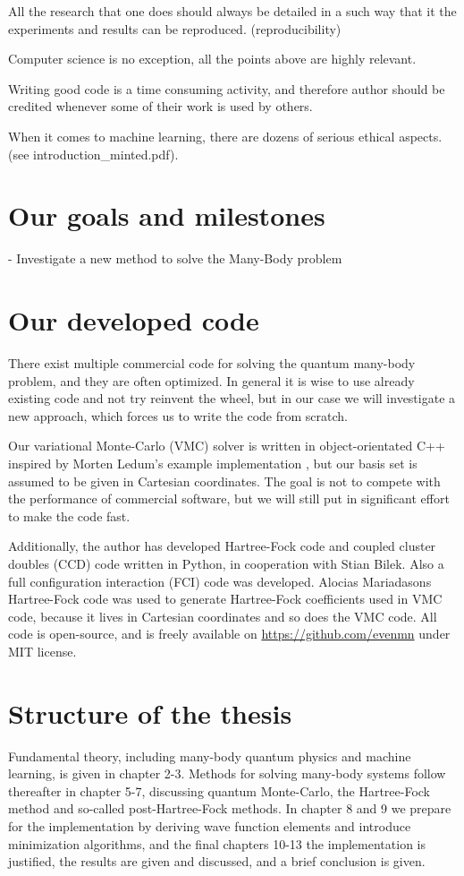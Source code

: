 All the research that one does should always be detailed in a such way that it the experiments and results can be reproduced. (reproducibility) 

Computer science is no exception, all the points above are highly relevant.  

Writing good code is a time consuming activity, and therefore author should be credited whenever some of their work is used by others. 

When it comes to machine learning, there are dozens of serious ethical aspects. (see introduction\_minted.pdf).

\section{Our goals and milestones} \label{subsec:goals}
- Investigate a new method to solve the Many-Body problem

\section{Our developed code}
There exist multiple commercial code for solving the quantum many-body problem, and they are often optimized. In general it is wise to use already existing code and not try reinvent the wheel, but in our case we will investigate a new approach, which forces us to write the code from scratch.

Our variational Monte-Carlo (VMC) solver is written in object-orientated C++ inspired by Morten Ledum's example implementation \cite{ledum_simple_2016}, but our basis set is assumed to be given in Cartesian coordinates. The goal is not to compete with the performance of commercial software, but we will still put in significant effort to make the code fast.  

Additionally, the author has developed Hartree-Fock code and coupled cluster doubles (CCD) code written in Python, in cooperation with Stian Bilek. Also a full configuration interaction (FCI) code was developed. Alocias Mariadasons Hartree-Fock code was used to generate Hartree-Fock coefficients used in VMC code, because it lives in Cartesian coordinates and so does the VMC code. All code is open-source, and is freely available on \url{https://github.com/evenmn} under MIT license. 

\section{Structure of the thesis}
Fundamental theory, including many-body quantum physics and machine learning, is given in chapter 2-3. Methods for solving many-body systems follow thereafter in chapter 5-7, discussing quantum Monte-Carlo, the Hartree-Fock method and so-called post-Hartree-Fock methods. In chapter 8 and 9 we prepare for the implementation by deriving wave function elements and introduce minimization algorithms, and the final chapters 10-13 the implementation is justified, the results are given and discussed, and a brief conclusion is given.
